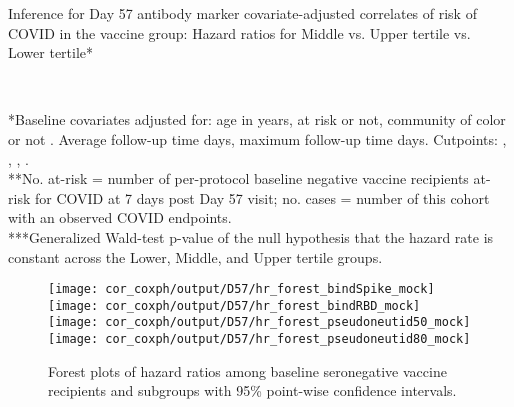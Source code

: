 \documentclass[
]{article}
\begin{document}
\begin{table}[H]
\caption{Inference for Day 57 antibody marker covariate-adjusted correlates of risk of COVID in the vaccine group: Hazard ratios for Middle vs. Upper tertile vs. Lower tertile*}
\begin{center}
\setlength{\tabcolsep}{.5ex}
\\
\end{center}
*Baseline covariates adjusted for: age in years, at risk or not, community of color or not
. Average follow-up time  days, maximum follow-up time  days. 
Cutpoints: 
,  
,  
,  
.
\\
**No. at-risk = number of per-protocol baseline negative vaccine recipients at-risk for COVID at 7 days post Day 57 visit; no. cases = number of this cohort with an observed COVID endpoints.\\
***Generalized Wald-test p-value of the null hypothesis that the hazard rate is constant across the Lower, Middle, and Upper tertile groups.

    \label{tab:CoR_univariable_svycoxph_cat_pretty_mock}
\end{table}

\begin{figure}[H]
    \texttt{[image: cor\_coxph/output/D57/hr\_forest\_bindSpike\_mock]}
    \texttt{[image: cor\_coxph/output/D57/hr\_forest\_bindRBD\_mock]}
    \texttt{[image: cor\_coxph/output/D57/hr\_forest\_pseudoneutid50\_mock]}
    \texttt{[image: cor\_coxph/output/D57/hr\_forest\_pseudoneutid80\_mock]}
    \caption{Forest plots of hazard ratios among baseline seronegative vaccine recipients and subgroups with 95\% point-wise confidence intervals.}
\end{figure}
\end{document}
